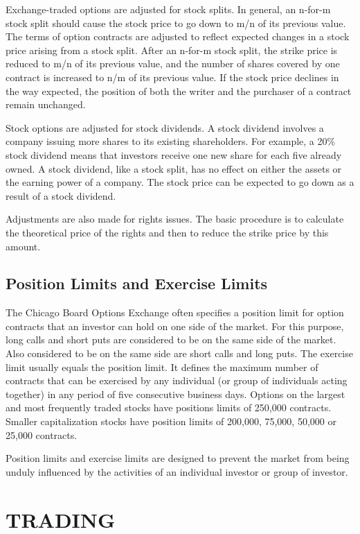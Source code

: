 \documentclass{article}
\begin{document}
Exchange-traded options are adjusted for stock splits. In general, an n-for-m stock split should cause the stock price to go down to m/n of its previous value. The terms of option contracts are adjusted to reflect expected changes in a stock price arising from a stock split. After an n-for-m stock split, the strike price is reduced to m/n of its previous value, and the number of shares covered by one contract is increased to n/m of its previous value. If the stock price declines in the way expected, the position of both the writer and the purchaser of a contract remain unchanged.

Stock options are adjusted for stock dividends. A stock dividend involves a company issuing more shares to its existing shareholders. For example, a 20\% stock dividend means that investors receive one new share for each five already owned. A stock dividend, like a stock split, has no effect on either the assets or the earning power of a company. The stock price can be expected to go down as a result of a stock dividend.

Adjustments are also made for rights issues. The basic procedure is to calculate the theoretical price of the rights and then to reduce the strike price by this amount.

\subsection{Position Limits and Exercise Limits}
The Chicago Board Options Exchange often specifies a position limit for option contracts that an investor can hold on one side of the market. For this purpose, long calls and short puts are considered to be on the same side of the market. Also considered to be on the same side are short calls and long puts. The exercise limit usually equals the position limit. It defines the maximum number of contracts that can be exercised by any individual (or group of individuals acting together) in any period of five consecutive business days. Options on the largest and most frequently traded stocks have positions limits of 250,000 contracts. Smaller capitalization stocks have position limits of 200,000, 75,000, 50,000 or 25,000 contracts.

Position limits and exercise limits are designed to prevent the market from being unduly influenced by the activities of an individual investor or group of investor.

\section{TRADING}
\end{document}
